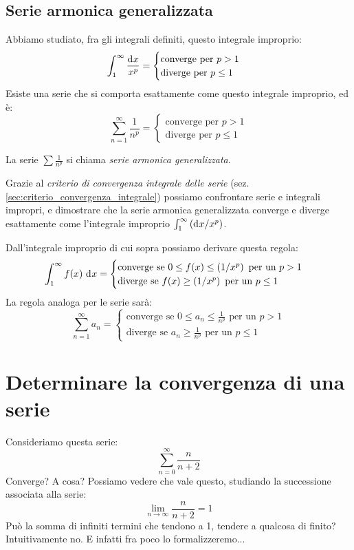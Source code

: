 \subsection{Serie armonica generalizzata}

Abbiamo studiato, fra gli integrali definiti, questo integrale improprio:
\[
\int_{1}^{\infty} \frac{\diff x}{x^p} = 
\begin{cases}
\text{converge per } p > 1 \\
\text{diverge per } p \le 1
\end{cases}
\]
Esiste una serie che si comporta esattamente come questo integrale improprio, ed \`e:
\[
\sum_{n = 1}^{\infty} \frac{1}{n^p} =
\begin{cases}
\text{converge per } p > 1 \\
\text{diverge per } p \le 1
\end{cases}
\]
\begin{defn}
La serie $\sum \frac{1}{n^p}$ si chiama \emph{serie armonica generalizzata}.
\end{defn}

Grazie al \emph{criterio di convergenza integrale delle serie} (sez. \ref{sec:criterio_convergenza_integrale}) possiamo confrontare serie e integrali impropri, e dimostrare che la serie armonica generalizzata converge e diverge esattamente come l'integrale improprio $\int_{1}^{\infty} \frac{\diff x}{x^p}$.

Dall'integrale improprio di cui sopra possiamo derivare questa regola:
\[
\int_{1}^{\infty} f(x) \dx = 
\begin{cases}
\text{converge se } 0 \le f(x) \le \frac{1}{x^p} \text{ per un } p > 1 \\
\text{diverge se } f(x) \ge \frac{1}{x^p} \text{ per un } p \le 1
\end{cases}
\]
La regola analoga per le serie sar\`a:
\[
\sum_{n = 1}^{\infty} a_n =
\begin{cases}
\text{converge se } 0 \le a_n \le \frac{1}{n^p} \text{ per un } p > 1 \\
\text{diverge se } a_n \ge \frac{1}{n^p} \text{ per un } p \le 1
\end{cases}
\]

\section{Determinare la convergenza di una serie} 

Consideriamo questa serie:
\begin{equation} \label{eq:serie_non_convergente}
\sum_{n = 0}^{\infty} \frac{n}{n + 2}
\end{equation}
Converge? A cosa? Possiamo vedere che vale questo, studiando la successione associata alla serie:
\[
\lim_{n \to \infty} \frac{n}{n+2} = 1
\]
Pu\`o la somma di infiniti termini che tendono a 1, tendere a qualcosa di finito? Intuitivamente no. E infatti fra poco lo formalizzeremo...

